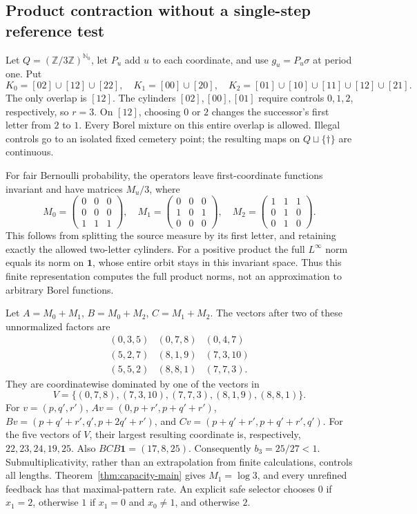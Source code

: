 \documentclass[11pt,reqno]{amsart}
\numberwithin{equation}{section}
\theoremstyle{definition}
\newcommand{\Nzero}{\mathbb N_0}
\newcommand{\one}{\mathbf 1}
\begin{document}
\subsection{Product contraction without a single-step reference test}
\label{subsec:product-example}
Let $Q=(\mathbb Z/3\mathbb Z)^{\Nzero}$, let $P_u$ add $u$
to each coordinate, and use $g_u=P_u\sigma$ at period one. Put
\[
 K_0=[02]\cup[12]\cup[22],\quad K_1=[00]\cup[20],\quad
 K_2=[01]\cup[10]\cup[11]\cup[12]\cup[21].
\]
The only overlap is $[12]$. The cylinders $[02],[00],[01]$
require controls $0,1,2$, respectively, so $r=3$.
On $[12]$, choosing $0$ or $2$ changes the successor's first
letter from $2$ to $1$. Every Borel mixture on this entire overlap
is allowed. Illegal controls go to an isolated fixed cemetery point;
the resulting maps on $Q\sqcup\{\dagger\}$ are continuous.

For fair Bernoulli probability, the operators leave first-coordinate
functions invariant and have matrices $M_u/3$, where
\[
 M_0=\begin{pmatrix}0&0&0\\0&0&0\\1&1&1\end{pmatrix},\quad
 M_1=\begin{pmatrix}0&0&0\\1&0&1\\0&0&0\end{pmatrix},\quad
 M_2=\begin{pmatrix}1&1&1\\0&1&0\\0&1&0\end{pmatrix}.
\]
This follows from splitting the source measure by its first letter,
and retaining exactly the allowed two-letter cylinders. For a
positive product the full $L^\infty$ norm equals its norm on
$\one$, whose entire orbit stays in this invariant space. Thus this
finite representation computes the full product norms, not an
approximation to arbitrary Borel functions.

Let $A=M_0+M_1$, $B=M_0+M_2$, $C=M_1+M_2$.
The vectors after two of these unnormalized factors are
\[
\begin{array}{ccc}
(0,3,5)&(0,7,8)&(0,4,7)\\
(5,2,7)&(8,1,9)&(7,3,10)\\
(5,5,2)&(8,8,1)&(7,7,3).
\end{array}
\]
They are coordinatewise dominated by one of the vectors in
\[
 V=\{(0,7,8),(7,3,10),(7,7,3),(8,1,9),(8,8,1)\}.
\]
For $v=(p,q',r')$,
$Av=(0,p+r',p+q'+r')$,
$Bv=(p+q'+r',q',p+2q'+r')$, and
$Cv=(p+q'+r',p+q'+r',q')$.
For the five vectors of $V$, their largest resulting coordinate is,
respectively, $22,23,24,19,25$. Also $BCB\one=(17,8,25)$.
Consequently $b_3=25/27<1$. Submultiplicativity, rather than an
extrapolation from finite calculations, controls all lengths.
Theorem~\ref{thm:capacity-main} gives $M_1=\log3$, and every
unrefined feedback has that maximal-pattern rate. An explicit safe
selector chooses $0$ if $x_1=2$, otherwise $1$ if $x_1=0$ and
$x_0\ne1$, and otherwise $2$.
\end{document}
